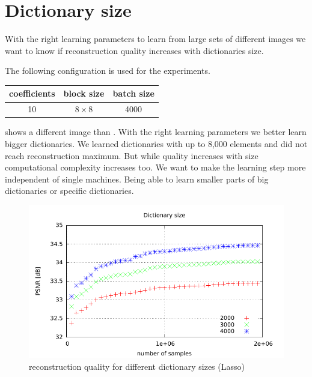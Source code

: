 

\clearpage

\section{Dictionary size}
With the right learning parameters to learn from large sets of
different images we want to know if reconstruction quality increases with
dictionaries size.

The following configuration is used for the experiments. 
\begin{table}[H]
\centering
\begin{tabular}{| c | c | c |}
\hline
\hline
coefficients & block size & batch size \\
\hline
10 & $8\times 8$ & 4000  \\
\hline
\end{tabular}
\end{table}

 shows a different image than
. With the right learning parameters 
we better learn bigger dictionaries. We learned dictionaries with up to 8,000
elements and did not reach reconstruction maximum. But while quality increases
with size computational complexity increases too. We want to make the learning
step more independent of single machines. Being able to learn smaller parts of
big dictionaries or specific dictionaries.


\begin{figure}[h]
\centering
\includegraphics[width = 1.0\textwidth]{../tests/results/dictSizeLassoGod.pdf}
\caption{reconstruction quality for different dictionary sizes (Lasso)}
\label{fig:dictSizeGood}
\end{figure}

